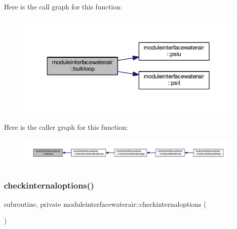 Here is the call graph for this function\+:\nopagebreak
\begin{figure}[H]
\begin{center}
\leavevmode
\includegraphics[width=350pt]{namespacemoduleinterfacewaterair_adca22635eac17186131c131155bfb929_cgraph}
\end{center}
\end{figure}
Here is the caller graph for this function\+:\nopagebreak
\begin{figure}[H]
\begin{center}
\leavevmode
\includegraphics[width=350pt]{namespacemoduleinterfacewaterair_adca22635eac17186131c131155bfb929_icgraph}
\end{center}
\end{figure}
\mbox{\label{namespacemoduleinterfacewaterair_a7bb7aa6672e098e262e702265ea4cbef}} 
\subsubsection{\texorpdfstring{checkinternaloptions()}{checkinternaloptions()}}
{\footnotesize\ttfamily subroutine, private moduleinterfacewaterair\+::checkinternaloptions (\begin{DoxyParamCaption}{ }\end{DoxyParamCaption})\hspace{0.3cm}{\ttfamily [private]}}

